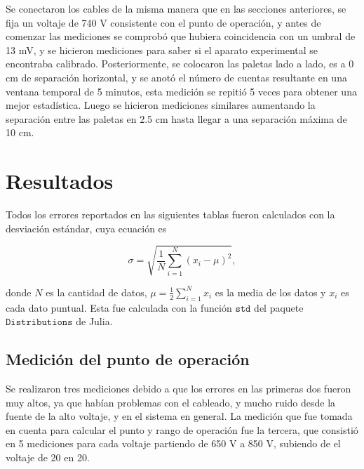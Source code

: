 \documentclass[a4paper,10pt]{article}
\numberwithin{equation}{section}
\begin{document}
\vspace{.3cm}

Se conectaron los cables de la misma manera que en las secciones anteriores, se 
fija un voltaje de 740 V consistente con el punto de  operación, y antes de comenzar 
las mediciones se comprobó que hubiera coincidencia con un umbral de 13 mV, y se 
hicieron mediciones para saber si el aparato experimental se encontraba calibrado. 
Posteriormente, se colocaron las paletas lado a lado, es a 0 cm de separación horizontal, 
y se anotó el número de cuentas resultante en una ventana temporal de 5 minutos, 
esta medición se repitió 5 veces para obtener una mejor estadística. Luego se 
hicieron mediciones similares aumentando la separación entre las paletas en 2.5 cm
hasta llegar a una separación máxima de 10 cm.

\newpage

\section{Resultados}
\label{s:resultados}

Todos los errores reportados en las siguientes tablas fueron calculados con la desviación 
estándar, cuya ecuación es 

\begin{equation}
 \sigma = \sqrt{\frac{1}{N}\sum_{i=1}^N (x_i - \mu)^2},
\end{equation}

donde $N$ es la cantidad de datos, $\mu = \frac{1}{2} \sum_{i=1}^N x_i$ es la 
media de los datos y $x_i$ es cada dato puntual. Esta fue calculada con la 
función \href{http://distributionsjl.readthedocs.org/en/latest/univariate.html?highlight=std\#std}{$\texttt{std}$} 
del paquete $\texttt{Distributions}$ de Julia.


\subsection{Medición del punto de operación}

Se realizaron tres mediciones debido a que los errores en las primeras dos fueron muy altos, 
ya que habían problemas con el cableado, y mucho ruido desde la fuente de la alto voltaje,
y en el sistema en general. La medición que fue tomada en cuenta para calcular el 
punto y rango de operación fue la tercera, que consistió en 5 mediciones para cada voltaje 
partiendo de 650 V a 850 V, subiendo de el voltaje de 20 en 20. 
\end{document}
